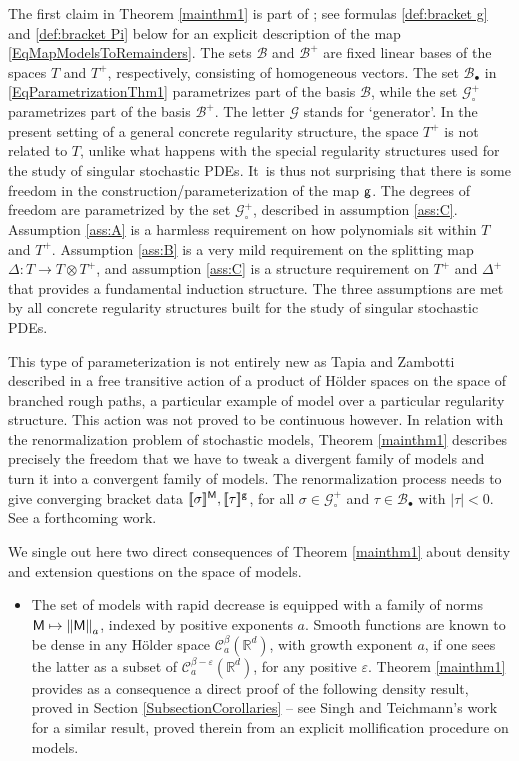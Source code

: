 \documentclass[JEP,XML,SOM,Unicode,published]{cedram}
\newcommand\mto{\mathchoice{\longmapsto}{\mapsto}{\mapsto}{\mapsto}}
\newcommand{\sbullet}{{\scriptscriptstyle\bullet}}
\theoremstyle{plain}
\theoremstyle{definition}
\newcommand{\Brac}[1]{[\![#1]\!]}
\let\epsilon\varepsilon
\newcommand{\bbR}{\mathbb{R}}
\newcommand{\mcB}{\mathcal{B}}
\newcommand{\mcC}{\mathcal{C}}
\newcommand{\mcG}{\mathcal{G}}
\begin{document}
The first claim in Theorem \ref{mainthm1} is part of \cite[Th.\,21]{BH}; see formulas \eqref{def:bracket g} and \eqref{def:bracket Pi} below for an explicit description of the map \eqref{EqMapModelsToRemainders}. The sets $\mcB$ and $\mcB^+$ are fixed linear bases of the spaces $T$ and $T^+$, respectively, consisting of homogeneous vectors. The set $\mcB_\sbullet$ in \eqref{EqParametrizationThm1} parametrizes part of the basis $\mcB$, while the set $\mcG_\circ^+$ parametrizes part of the basis $\mcB^+$. The letter $\mcG$ stands for `generator'. In the present setting of a general concrete regularity structure, the space $T^+$ is not related to $T$, unlike what happens with the special regularity structures used for the study of singular stochastic PDEs. It~is thus not surprising that there is some freedom in the construction/parameterization of the map $\sf g$. The degrees of freedom are parametrized by the set $\mcG^+_\circ$, described in assumption \eqref{ass:C}. Assumption \eqref{ass:A} is a harmless requirement on how polynomials sit within $T$ and $T^+$. Assumption \eqref{ass:B} is a very mild requirement on the splitting map $\Delta : T\to T\otimes T^+$, and assumption \eqref{ass:C} is a structure requirement on $T^+$ and $\Delta^+$ that provides a fundamental induction structure. The three assumptions are met by all concrete regularity structures built for the study of singular stochastic PDEs.

This type of parameterization is not entirely new as Tapia and Zambotti described in \cite{TZ18} a free transitive action of a product of Hölder spaces on the space of branched rough paths, a particular example of model over a particular regularity structure. This action was not proved to be continuous however. In relation with the renormalization problem of stochastic models, Theorem \ref{mainthm1} describes precisely the freedom that we have to tweak a divergent family of models and turn it into a convergent family of models. The renormalization process needs to give converging bracket data $\Brac{\sigma}^{\sf M}, \Brac{\tau}^{\sf g}$, for all $\sigma\in\mcG_\circ^+$ and $\tau\in\mcB_\sbullet$ with $\vert\tau\vert<0$. See a forthcoming work.

We single out here two direct consequences of Theorem \ref{mainthm1} about density and extension questions on the space of models.

\begin{itemize}
\item
The set of models with rapid decrease is equipped with a family of norms ${\sf M\mto \|M\|}_a$, indexed by positive exponents $a$. Smooth functions are known to be dense in any Hölder space $\mcC^\beta_a(\bbR^d)$, with growth exponent $a$, if one sees the latter as a subset of $\mcC^{\beta-\epsilon}_a(\bbR^d)$, for any positive $\epsilon$. Theorem \ref{mainthm1} provides as a consequence a direct proof of the following density result, proved in Section \ref{SubsectionCorollaries} -- see Singh and Teichmann's work \cite{SinghTeichmann} for a similar result, proved therein from an explicit mollification procedure on models.
\end{itemize}
\end{document}
